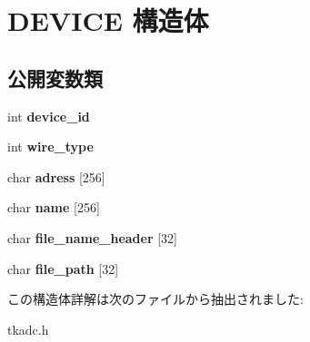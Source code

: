 \hypertarget{struct_d_e_v_i_c_e}{}\section{D\+E\+V\+I\+CE 構造体}
\label{struct_d_e_v_i_c_e}
\subsection*{公開変数類}
\begin{DoxyCompactItemize}
\item 
\mbox{\label{struct_d_e_v_i_c_e_a3437c54a22f99806d6ed2de7ce111942}} 
int {\bfseries device\+\_\+id}
\item 
\mbox{\label{struct_d_e_v_i_c_e_acdc0506b80caaef845d091a70b4863d1}} 
int {\bfseries wire\+\_\+type}
\item 
\mbox{\label{struct_d_e_v_i_c_e_a3ff80bbb695010b27b7ced05c8ec04ae}} 
char {\bfseries adress} \mbox{[}256\mbox{]}
\item 
\mbox{\label{struct_d_e_v_i_c_e_ac1c9868f69ed36d904cb2f725e36c18f}} 
char {\bfseries name} \mbox{[}256\mbox{]}
\item 
\mbox{\label{struct_d_e_v_i_c_e_adbb1540fbc519029ecd73747c0a24773}} 
char {\bfseries file\+\_\+name\+\_\+header} \mbox{[}32\mbox{]}
\item 
\mbox{\label{struct_d_e_v_i_c_e_abbd372951f35b2703c768c260ecb7817}} 
char {\bfseries file\+\_\+path} \mbox{[}32\mbox{]}
\end{DoxyCompactItemize}


この構造体詳解は次のファイルから抽出されました\+:\begin{DoxyCompactItemize}
\item 
tkadc.\+h\end{DoxyCompactItemize}
